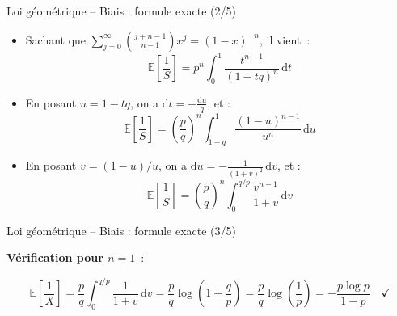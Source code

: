 \documentclass[11pt,aspectratio=169]{beamer}
\newcommand{\dd}{\mathrm{d}}
\begin{document}
\begin{frame}{Loi géométrique -- Biais : formule exacte (2/5)}

  \begin{itemize}

  \item Sachant que $\sum_{j=0}^{\infty} \binom{j+n-1}{n-1} x^j = (1-x)^{-n}$, il vient~:
    \[
      \mathbb{E}\left[\frac{1}{S}\right] = p^n \int_0^1 \frac{t^{n-1}}{(1-tq)^n} \, \dd t
    \]

  \item En posant $u = 1 - tq$, on a $\dd t = -\frac{\dd u}{q}$, et :
    \[
      \mathbb{E}\left[\frac{1}{S}\right] = \left(\frac{p}{q}\right)^n \int_{1-q}^{1} \frac{(1-u)^{n-1}}{u^n} \, \dd u
    \]

  \item En posant $v = (1-u)/u$, on a $\dd u = -\frac{1}{(1+v)^2} \, \dd v$, et :
    \[
        \mathbb{E}\left[\frac{1}{S}\right] = \left(\frac{p}{q}\right)^n \int_0^{q/p} \frac{v^{n-1}}{1+v} \, \dd v
    \]
    
  \end{itemize}
  
\end{frame}

\begin{frame}{Loi géométrique -- Biais : formule exacte (3/5)}

  \textbf{Vérification pour $n = 1$}~:\newline
  
    \[
      \mathbb{E}\left[\frac{1}{X}\right] = \frac{p}{q} \int_0^{q/p} \frac{1}{1+v} \, \dd v = \frac{p}{q} \log\left(1 + \frac{q}{p}\right) = \frac{p}{q} \log\left(\frac{1}{p}\right) = -\frac{p \log p}{1-p} \quad \checkmark
    \]

\end{frame}
\end{document}
